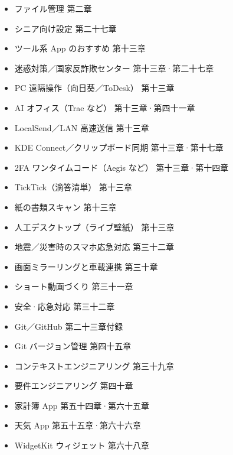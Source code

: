 
\begin{itemize}
  \item ファイル管理 第二章
  \item シニア向け設定 第二十七章
  \item ツール系 App のおすすめ 第十三章
  \item 迷惑対策／国家反詐欺センター 第十三章·第二十七章
  \item PC 遠隔操作（向日葵／ToDesk） 第十三章
  \item AI オフィス（Trae など） 第十三章·第四十一章
  \item LocalSend／LAN 高速送信 第十三章
  \item KDE Connect／クリップボード同期 第十三章·第十七章
  \item 2FA ワンタイムコード（Aegis など） 第十三章·第十四章
  \item TickTick（滴答清単） 第十三章
  \item 紙の書類スキャン 第十三章
  \item 人工デスクトップ（ライブ壁紙） 第十三章
  \item 地震／災害時のスマホ応急対応 第三十二章
  \item 画面ミラーリングと車載連携 第三十章
  \item ショート動画づくり 第三十一章
  \item 安全·応急対応 第三十二章
  \item Git／GitHub 第二十三章付録
  \item Git バージョン管理 第四十五章
  \item コンテキストエンジニアリング 第三十九章
  \item 要件エンジニアリング 第四十章
  \item 家計簿 App 第五十四章·第六十五章
  \item 天気 App 第五十五章·第六十六章
  \item WidgetKit ウィジェット 第六十八章
\end{itemize}
